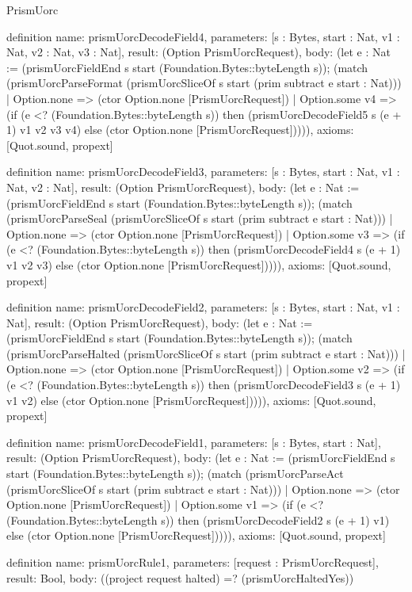 \begin{lexlean}{PrismUorc}
\begin{semanticmodule}
definition{
  name: prismUorcDecodeField4,
  parameters: [s : Bytes, start : Nat, v1 : Nat, v2 : Nat, v3 : Nat],
  result: (Option PrismUorcRequest),
  body: (let e : Nat := (prismUorcFieldEnd s start (Foundation.Bytes::byteLength s)); (match (prismUorcParseFormat (prismUorcSliceOf s start (prim subtract e start : Nat)))
    | Option.none => (ctor Option.none [PrismUorcRequest])
    | Option.some v4 => (if (e <? (Foundation.Bytes::byteLength s)) then (prismUorcDecodeField5 s (e + 1) v1 v2 v3 v4) else (ctor Option.none [PrismUorcRequest])))),
  axioms: [Quot.sound, propext]
}

definition{
  name: prismUorcDecodeField3,
  parameters: [s : Bytes, start : Nat, v1 : Nat, v2 : Nat],
  result: (Option PrismUorcRequest),
  body: (let e : Nat := (prismUorcFieldEnd s start (Foundation.Bytes::byteLength s)); (match (prismUorcParseSeal (prismUorcSliceOf s start (prim subtract e start : Nat)))
    | Option.none => (ctor Option.none [PrismUorcRequest])
    | Option.some v3 => (if (e <? (Foundation.Bytes::byteLength s)) then (prismUorcDecodeField4 s (e + 1) v1 v2 v3) else (ctor Option.none [PrismUorcRequest])))),
  axioms: [Quot.sound, propext]
}

definition{
  name: prismUorcDecodeField2,
  parameters: [s : Bytes, start : Nat, v1 : Nat],
  result: (Option PrismUorcRequest),
  body: (let e : Nat := (prismUorcFieldEnd s start (Foundation.Bytes::byteLength s)); (match (prismUorcParseHalted (prismUorcSliceOf s start (prim subtract e start : Nat)))
    | Option.none => (ctor Option.none [PrismUorcRequest])
    | Option.some v2 => (if (e <? (Foundation.Bytes::byteLength s)) then (prismUorcDecodeField3 s (e + 1) v1 v2) else (ctor Option.none [PrismUorcRequest])))),
  axioms: [Quot.sound, propext]
}

definition{
  name: prismUorcDecodeField1,
  parameters: [s : Bytes, start : Nat],
  result: (Option PrismUorcRequest),
  body: (let e : Nat := (prismUorcFieldEnd s start (Foundation.Bytes::byteLength s)); (match (prismUorcParseAct (prismUorcSliceOf s start (prim subtract e start : Nat)))
    | Option.none => (ctor Option.none [PrismUorcRequest])
    | Option.some v1 => (if (e <? (Foundation.Bytes::byteLength s)) then (prismUorcDecodeField2 s (e + 1) v1) else (ctor Option.none [PrismUorcRequest])))),
  axioms: [Quot.sound, propext]
}

definition{
  name: prismUorcRule1,
  parameters: [request : PrismUorcRequest],
  result: Bool,
  body: ((project request halted) =? (prismUorcHaltedYes))
}


\end{semanticmodule}
\end{lexlean}
